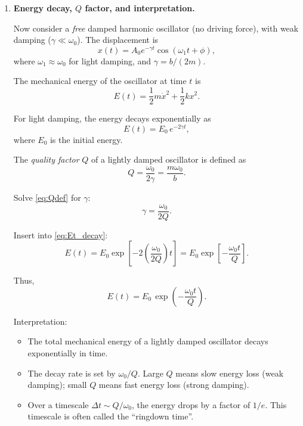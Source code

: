 \documentclass[../main.tex]{subfiles}
\begin{document}
\begin{enumerate}
\item \textbf{Energy decay, $Q$ factor, and interpretation.}

Now consider a \emph{free} damped harmonic oscillator (no driving force), with weak damping ($\gamma \ll \omega_0$). The displacement is
\[
x(t) = A_0 e^{-\gamma t} \cos(\omega_1 t + \phi),
\]
where $\omega_1 \approx \omega_0$ for light damping, and $\gamma = b/(2m)$.

The mechanical energy of the oscillator at time $t$ is
\[
E(t) = \frac{1}{2} m \dot{x}^2 + \frac{1}{2} k x^2.
\]

For light damping, the energy decays exponentially as
\begin{equation}
E(t) = E_0 \, e^{-2 \gamma t},
\label{eq:Et_decay}
\end{equation}
where $E_0$ is the initial energy.

The \emph{quality factor} $Q$ of a lightly damped oscillator is defined as
\begin{equation}
Q = \frac{\omega_0}{2\gamma}
= \frac{m \omega_0}{b}.
\label{eq:Qdef}
\end{equation}

Solve \eqref{eq:Qdef} for $\gamma$:
\[
\gamma = \frac{\omega_0}{2Q}.
\]

Insert into \eqref{eq:Et_decay}:
\[
E(t) = E_0 \exp\!\left[-2 \left(\frac{\omega_0}{2Q}\right) t \right]
= E_0 \exp\!\left[- \frac{\omega_0 t}{Q} \right].
\]

Thus,
\begin{equation}
\boxed{
E(t) = E_0 \, \exp\!\left( - \frac{\omega_0 t}{Q} \right).
}
\end{equation}

Interpretation:

\begin{itemize}
    \item The total mechanical energy of a lightly damped oscillator decays exponentially in time.
    \item The decay rate is set by $\omega_0/Q$. Large $Q$ means slow energy loss (weak damping); small $Q$ means fast energy loss (strong damping).
    \item Over a timescale $\Delta t \sim Q/\omega_0$, the energy drops by a factor of $1/e$. This timescale is often called the ``ringdown time''.
\end{itemize}

\end{enumerate}
\end{document}
